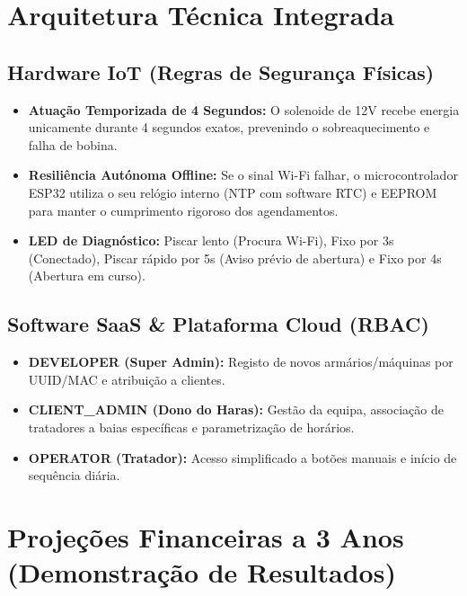 \documentclass[11pt,a4paper]{article}
\begin{document}
\section{Arquitetura Técnica Integrada}

\subsection{Hardware IoT (Regras de Segurança Físicas)}
\begin{itemize}[leftmargin=*]
    \item \textbf{Atuação Temporizada de 4 Segundos:} O solenoide de 12V recebe energia unicamente durante 4 segundos exatos, prevenindo o sobreaquecimento e falha de bobina.
    \item \textbf{Resiliência Autónoma Offline:} Se o sinal Wi-Fi falhar, o microcontrolador ESP32 utiliza o seu relógio interno (NTP com software RTC) e EEPROM para manter o cumprimento rigoroso dos agendamentos.
    \item \textbf{LED de Diagnóstico:} Piscar lento (Procura Wi-Fi), Fixo por 3s (Conectado), Piscar rápido por 5s (Aviso prévio de abertura) e Fixo por 4s (Abertura em curso).
\end{itemize}

\subsection{Software SaaS \& Plataforma Cloud (RBAC)}
\begin{itemize}[leftmargin=*]
    \item \textbf{DEVELOPER (Super Admin):} Registo de novos armários/máquinas por UUID/MAC e atribuição a clientes.
    \item \textbf{CLIENT\_ADMIN (Dono do Haras):} Gestão da equipa, associação de tratadores a baias específicas e parametrização de horários.
    \item \textbf{OPERATOR (Tratador):} Acesso simplificado a botões manuais e início de sequência diária.
\end{itemize}

\section{Projeções Financeiras a 3 Anos (Demonstração de Resultados)}
\end{document}

